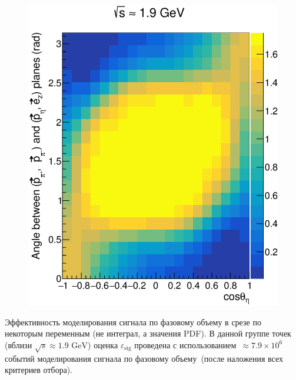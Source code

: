 \documentclass{beamer}
\begin{document}
\begin{frame}
\begin{center}
\begin{minipage}[t]{0.4\linewidth}
\begin{figure}
        \includegraphics[width=\linewidth]{figures/kde_zu_signal.eps}
      \end{figure}
    \end{minipage}
  \end{center}
  \scriptsize
  Эффективность моделирования сигнала по фазовому объему в срезе по некоторым переменным (не интеграл, а значения
  PDF). В данной группе точек (вблизи $\sqrt{s}\approx 1.9\text{ GeV}$) оценка $\varepsilon_{\text{sig}}$ проведена с
  использованием~$\approx{}7.9\times{}10^6$ событий моделирования сигнала по фазовому
  объему~(после наложения всех критериев отбора).
\end{frame}
\end{document}
